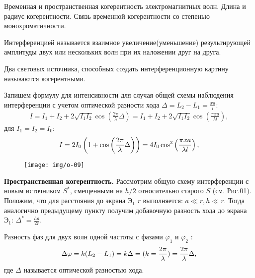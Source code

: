 ﻿\documentclass[__main__.tex]{subfiles}
\begin{document}
Временная и пространственная когерентность электромагнитных волн. Длина и радиус когерентности. Связь временной когерентности со степенью монохроматичности.\\ 

\begin{definition}
	Интерференцией называется взаимное увеличение(уменьшение) результирующей амплитуды двух или нескольких волн при их наложении друг на друга.
\end{definition}

\begin{definition}
	Два световых источника, способных создать интерференционную картину называются когерентными.
\end{definition}

Запишем формулу для интенсивности для случая общей схемы наблюдения интерференции с учетом оптической разности хода $\displaystyle \Delta = L_2 - L_1 = \frac{xa}{l}$:
\begin{gather*}
I = I_1 + I_2 + 2\sqrt{I_1 I_2}\cos\left(\frac{2\pi}{\lambda}\Delta\right) =
I_1 + I_2 + 2\sqrt{I_1 I_2}\cos\left(\frac{\pi x a}{\lambda l}\right),
\end{gather*}
для $I_1 = I_2 = I_0$:
\begin{gather}
\llabel{o-02-intensesch}
I = 2I_0\left(1 + \cos\left(\frac{2\pi}{\lambda}\Delta\right)\right) =
4I_0\cos^2\left(\frac{\pi xa}{\lambda l}\right),
\end{gather}

\begin{wrapfigure}{R}{0.3\linewidth}
	\texttt{[image: img/o-09]}{}
	\caption{}
\end{wrapfigure}

\textbf{Пространственная когерентность.}
Рассмотрим общую схему интерференции с новым источником $S^*$, смещенными на $h/2$ относительно старого $S$ (см. Рис.01). Положим, что для расстояния до экрана $\text{Э}_1$ $r$ выполняется: $a\ll r, h\ll r$. Тогда аналогично предыдущему пункту получим добавочную разность хода до экрана $\text{Э}_1$: $\Delta^* = \frac{ha}{2r}$. 


Разность фаз для двух волн одной частоты с фазами $\varphi_1$ и $\varphi_2$ :
\begin{gather}
\llabel{o-02-phasediff}
\Delta \varphi = k(L_2 - L_1) = k \Delta =
(k = \frac{2\pi}{\lambda}) =
\frac{2\pi}{\lambda}\Delta,
\end{gather}
где $\Delta$ называется оптической разностью хода. 
\end{document}
